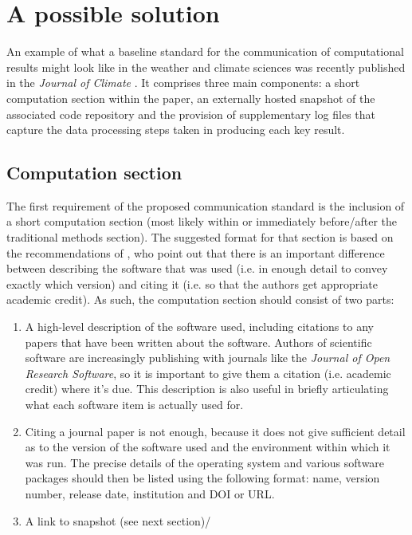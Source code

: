 \section{A possible solution}

An example of what a baseline standard for the communication of computational results might look like in the weather and climate sciences was recently published in the \textit{Journal of Climate} \citep{Irving2015}. It comprises three main components: a short computation section within the paper, an externally hosted snapshot of the associated code repository and the provision of supplementary log files that capture the data processing steps taken in producing each key result. 

\subsection{Computation section}

The first requirement of the proposed communication standard is the inclusion of a short computation section (most likely within or immediately before/after the traditional methods section). The suggested format for that section is based on the recommendations of \citet{Jackson2012}, who point out that there is an important difference between describing the software that was used (i.e. in enough detail to convey exactly which version) and citing it (i.e. so that the authors get appropriate academic credit). As such, the computation section should consist of two parts:
\begin{enumerate}
\item A high-level description of the software used, including citations to any papers that have been written about the software. Authors of scientific software are increasingly publishing with journals like the \textit{Journal of Open Research Software}, so it is important to give them a citation (i.e. academic credit) where it's due. This description is also useful in briefly articulating what each software item is actually used for.
\item Citing a journal paper is not enough, because it does not give sufficient detail as to the version of the software used and the environment within which it was run. The precise details of the operating system and various software packages should then be listed using the following format: name, version number, release date, institution and DOI or URL.
\item A link to snapshot (see next section)/
\end{enumerate}
 
